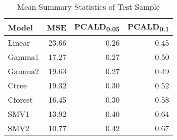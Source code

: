 \begin{table}[h]
\centering
{\small
\begin{tabular}{lrrr}
  \toprule
Model & MSE & PCALD\textsubscript{0.05} & PCALD\textsubscript{0.1} \\ 
  \midrule
Linear & 23.66 & 0.26 & 0.45 \\ 
  Gamma1 & 17.27 & 0.27 & 0.50 \\ 
  Gamma2 & 19.63 & 0.27 & 0.49 \\ 
  Ctree & 19.32 & 0.30 & 0.52 \\ 
  Cforest & 16.45 & 0.30 & 0.58 \\ 
  SMV1 & 13.92 & 0.40 & 0.64 \\ 
  SMV2 & 10.77 & 0.42 & 0.67 \\ 
   \bottomrule
\end{tabular}
}
\caption{Mean Summary Statistics of Test Sample} 
\label{ta:sumTest}
\end{table}
